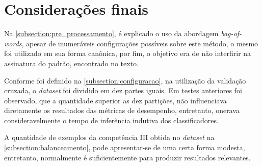 \section{Considerações finais}

Na \autoref{subsection:pre_processamento}, é explicado o uso da abordagem
\textit{bag-of-words}, apesar de inumeráveis configurações possíveis sobre este 
método, o mesmo foi utilizado em sua forma canônica, por fim, o objetivo era de 
não interfirir na assinatura do padrão, encontrado no texto.

Conforme foi definido na \autoref{subsection:configuracao}, na utilização da 
validação cruzada, o \textit{dataset} foi dividido em dez partes iguais. Em 
testes anteriores foi observado, que a quantidade superior as dez partições, 
não influenciava diretamente os resultados das métricas de desempenho, 
entretanto, onerava consideravelmente o tempo de inferência indutiva dos 
classificadores.

A quantidade de exemplos da competência III obtida no \textit{dataset} na 
\autoref{subsection:balanceamento}, pode apresentar-se de uma certa forma 
modesta, entretanto, normalmente é suficientemente para produzir resultados 
relevantes.
